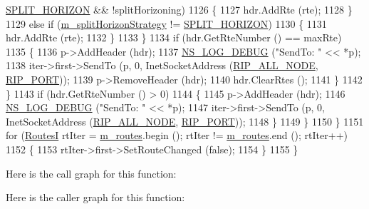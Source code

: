 \begin{DoxyCode}
      \hyperlink{classns3_1_1Rip_aa65e80d926399a90bc81b30dfc9404a4a37e78b48a284b4248a999e281e8ea5f9}{SPLIT\_HORIZON} && !splitHorizoning)
1126                     \{
1127                       hdr.AddRte (rte);
1128                     \}
1129                   \textcolor{keywordflow}{else} \textcolor{keywordflow}{if} (\hyperlink{classns3_1_1Rip_a2053001529a46356e1f612dfde6b4faf}{m\_splitHorizonStrategy} != 
      \hyperlink{classns3_1_1Rip_aa65e80d926399a90bc81b30dfc9404a4a37e78b48a284b4248a999e281e8ea5f9}{SPLIT\_HORIZON})
1130                     \{
1131                       hdr.AddRte (rte);
1132                     \}
1133                 \}
1134               \textcolor{keywordflow}{if} (hdr.GetRteNumber () == maxRte)
1135                 \{
1136                   p->AddHeader (hdr);
1137                   \hyperlink{group__logging_ga413f1886406d49f59a6a0a89b77b4d0a}{NS\_LOG\_DEBUG} (\textcolor{stringliteral}{"SendTo: "} << *p);
1138                   iter->first->SendTo (p, 0, InetSocketAddress (\hyperlink{rip_8cc_a4088e07a51c9aabba6666b6c1e85f704}{RIP\_ALL\_NODE}, 
      \hyperlink{rip_8cc_a6af26a435808c34ee4f8876792a5682a}{RIP\_PORT}));
1139                   p->RemoveHeader (hdr);
1140                   hdr.ClearRtes ();
1141                 \}
1142             \}
1143           \textcolor{keywordflow}{if} (hdr.GetRteNumber () > 0)
1144             \{
1145               p->AddHeader (hdr);
1146               \hyperlink{group__logging_ga413f1886406d49f59a6a0a89b77b4d0a}{NS\_LOG\_DEBUG} (\textcolor{stringliteral}{"SendTo: "} << *p);
1147               iter->first->SendTo (p, 0, InetSocketAddress (\hyperlink{rip_8cc_a4088e07a51c9aabba6666b6c1e85f704}{RIP\_ALL\_NODE}, 
      \hyperlink{rip_8cc_a6af26a435808c34ee4f8876792a5682a}{RIP\_PORT}));
1148             \}
1149         \}
1150     \}
1151   \textcolor{keywordflow}{for} (\hyperlink{classns3_1_1Rip_a8819af4dd44f270b6b19be755b39bce8}{RoutesI} rtIter = \hyperlink{classns3_1_1Rip_aea6c918ae311cd88fb2bfb714d6f9c30}{m\_routes}.begin (); rtIter != \hyperlink{classns3_1_1Rip_aea6c918ae311cd88fb2bfb714d6f9c30}{m\_routes}.end (); rtIter++)
1152     \{
1153       rtIter->first->SetRouteChanged (\textcolor{keyword}{false});
1154     \}
1155 \}
\end{DoxyCode}


Here is the call graph for this function\+:




Here is the caller graph for this function\+:


